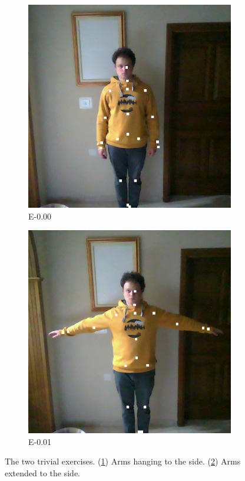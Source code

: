 \begin{figure}[ht]
  \centering
  \begin{subfigure}[b]{0.32\linewidth}
      \centering
      \includegraphics[width=\textwidth]{figures/samples/trivial/E-0.00_10.png}
      \caption[]{E-0.00}
      \label{fig:trivial_0}
  \end{subfigure}
  \hfill
  \begin{subfigure}[b]{0.32\linewidth}
      \centering
      \includegraphics[width=\textwidth]{figures/samples/trivial/E-0.01_38.png}
      \caption[]{E-0.01}
      \label{fig:trivial_1}
  \end{subfigure}
  \caption[Trivial Exercises]{The two trivial exercises. (\ref{fig:trivial_0}) Arms hanging to the side. (\ref{fig:trivial_1}) Arms extended to the side.}
  \label{fig:trivial_exercises}
\end{figure}  

